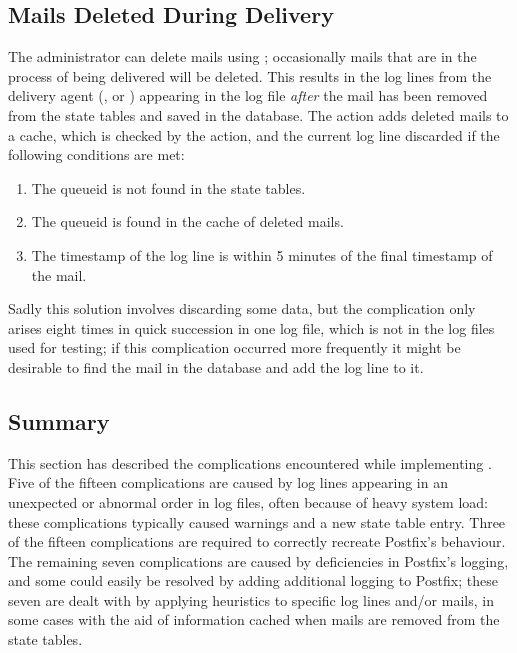 \subsection{Mails Deleted During Delivery}

\label{Mails deleted during delivery}

The administrator can delete mails using ; occasionally
mails that are in the process of being delivered will be deleted.  This
results in the log lines from the delivery agent (,
 or ) appearing in the log file
\textit{after\/} the mail has been removed from the state tables and saved
in the database.  The  action adds deleted mails to a cache,
which is checked by the  action, and the current log
line discarded if the following conditions are met:

\begin{enumerate}

    \item The queueid is not found in the state tables.

    \item The queueid is found in the cache of deleted mails.

    \item The timestamp of the log line is within 5 minutes of the final
        timestamp of the mail.

\end{enumerate}

Sadly this solution involves discarding some data, but the complication
only arises eight times in quick succession in one log file, which is not
in the \numberOFlogFILES{} log files used for testing; if this complication
occurred more frequently it might be desirable to find the mail in the
database and add the log line to it.

\subsection{Summary}

This section has described the complications encountered while implementing
\parsername{}.  Five of the fifteen complications are caused by log lines
appearing in an unexpected or abnormal order in log files, often because of
heavy system load: these complications typically caused warnings and a new
state table entry.  Three of the fifteen complications are required to
correctly recreate Postfix's behaviour.  The remaining seven complications
are caused by deficiencies in Postfix's logging, and some could easily be
resolved by adding additional logging to Postfix; these seven are
dealt with by applying heuristics to specific log lines and/or mails, in
some cases with the aid of information cached when mails are removed from
the state tables.
